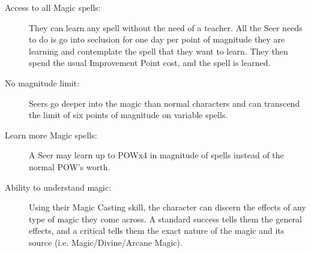 \begin{description}
\item[Access to all Magic spells:] They can learn any spell without the need of a teacher. All the Seer needs to do is go into seclusion for one day per point of magnitude they are learning and contemplate the spell that they want to learn. They then spend the usual Improvement Point cost, and the spell is learned.

\item[No magnitude limit:] Seers go deeper into the magic than normal characters and can transcend the limit of six points of magnitude on variable spells.

\item[Learn more Magic spells:] A Seer may learn up to POWx4 in magnitude of spells instead of the normal POW’s worth.

\item[Ability to understand magic:] Using their Magic Casting skill, the character can discern the effects of any type of magic they come across. A standard success tells them the general effects, and a critical tells them the exact nature of the magic and its source (i.e. Magic/Divine/Arcane Magic).


\end{description}
